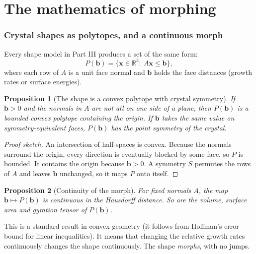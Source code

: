 \documentclass[11pt,a4paper]{article}
\newtheorem{proposition}{Proposition}
\theoremstyle{remark}\newtheorem*{example}{Worked example}
\newcommand{\vect}[1]{\mathbf{#1}}
\begin{document}
\part{The mathematics of morphing}
\section{Crystal shapes as polytopes, and a continuous morph}\label{sec:morph}

Every shape model in Part III produces a set of the same form:
\begin{equation}
P(\vect{b})=\{\vect{x}\in\mathbb{R}^3:\ A\vect{x}\le\vect{b}\},
\end{equation}
where each row of $A$ is a unit face normal and $\vect{b}$ holds the face distances (growth rates or surface energies).

\begin{proposition}[The shape is a convex polytope with crystal symmetry]\label{prop:convex}
If $\vect{b}>0$ and the normals in $A$ are not all on one side of a plane, then $P(\vect{b})$ is a bounded convex polytope containing the origin. If $\vect{b}$ takes the same value on symmetry-equivalent faces, $P(\vect{b})$ has the point symmetry of the crystal.
\end{proposition}
\begin{proof}[Proof sketch]
An intersection of half-spaces is convex. Because the normals surround the origin, every direction is eventually blocked by some face, so $P$ is bounded. It contains the origin because $\vect{b}>0$. A symmetry $S$ permutes the rows of $A$ and leaves $\vect{b}$ unchanged, so it maps $P$ onto itself.
\end{proof}

\begin{proposition}[Continuity of the morph]\label{prop:cont}
For fixed normals $A$, the map $\vect{b}\mapsto P(\vect{b})$ is continuous in the Hausdorff distance. So are the volume, surface area and gyration tensor of $P(\vect{b})$.
\end{proposition}
This is a standard result in convex geometry (it follows from Hoffman's error bound for linear inequalities). It means that changing the relative growth rates continuously changes the shape continuously. The shape \emph{morphs}, with no jumps.
\end{document}
